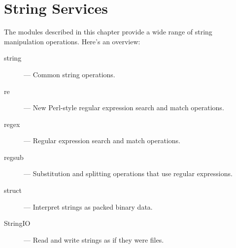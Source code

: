 \chapter{String Services}
\label{strings}

The modules described in this chapter provide a wide range of string
manipulation operations.  Here's an overview:

\begin{description}

\item[string]
--- Common string operations.

\item[re]
--- New Perl-style regular expression search and match operations.

\item[regex]
--- Regular expression search and match operations.

\item[regsub]
--- Substitution and splitting operations that use regular expressions.

\item[struct]
--- Interpret strings as packed binary data.

\item[StringIO]
--- Read and write strings as if they were files.

\end{description}
